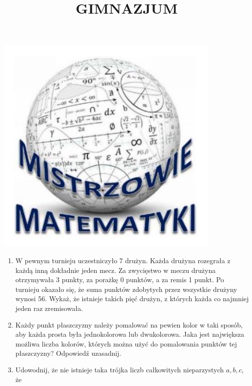 \documentclass[10pt]{article}
\title{GIMNAZJUM }
\author{}
\date{}
\begin{document}
\maketitle
\begin{center}
\includegraphics[max width=\textwidth]{2024_11_21_9ff893d5d7b74ec14eddg-1}
\end{center}

\begin{enumerate}
  \item W pewnym turnieju uczestniczyło 7 drużyn. Każda drużyna rozegrała z każdą inną dokładnie jeden mecz. Za zwycięstwo w meczu drużyna otrzymywała 3 punkty, za porażkę 0 punktów, a za remis 1 punkt. Po turnieju okazało się, że suma punktów zdobytych przez wszystkie drużyny wynosi 56. Wykaż, że istnieje takich pięć drużyn, z których każda co najmniej jeden raz zremisowała.
  \item Każdy punkt płaszczyzny należy pomalować na pewien kolor w taki sposób, aby każda prosta była jednokolorowa lub dwukolorowa. Jaka jest największa możliwa liczba kolorów, których można użyć do pomalowania punktów tej płaszczyzny? Odpowiedź uzasadnij.
  \item Udowodnij, że nie istnieje taka trójka liczb całkowitych nieparzystych \(a, b, c\), że
\end{enumerate}
\end{document}
